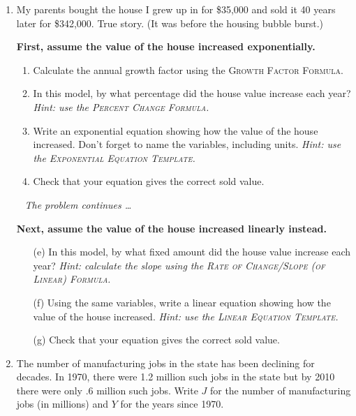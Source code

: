 \begin{enumerate}

\item My parents bought the house I grew up in for \$35,000 and sold it 40 years later for \$342,000. True story.  (It was before the housing bubble burst.)

\textbf{First, assume the value of the house increased exponentially.}
\begin{enumerate}
\item Calculate the annual growth factor using the \textsc{Growth Factor Formula}. \vfill \vfill
\item In this model, by what percentage did the house value increase each year? \emph{Hint:  use the \textsc{Percent Change Formula}.} \vfill
\item Write an exponential equation showing how the value of the house increased.   Don't forget to name the variables, including units.  \emph{Hint:  use the \textsc{Exponential Equation Template}.} \vfill  \vfill \vfill
\item Check that your equation gives the correct sold value. \vfill
\end{enumerate}

\newpage %
~\hspace{-.5in} \emph{The problem continues \ldots}

\textbf{Next, assume the value of the house increased linearly instead.}
\begin{enumerate} 
\item [(e)] In this model, by what fixed amount did the house value increase each year?  \emph{Hint:  calculate the slope using the \textsc{Rate of Change/Slope (of Linear) Formula}.} \vfill \vfill
\item [(f)] Using the same variables, write a linear equation showing how the value of the house increased.  \emph{Hint:  use the \textsc{Linear Equation Template}.}  \vfill \vfill
\item [(g)] Check that your equation gives the correct sold value.  \vfill
\end{enumerate}

\newpage %

\item The number of manufacturing jobs in the state has been declining for decades. In 1970, there were 1.2 million such jobs in the state but by 2010 there were only .6 million such jobs.   Write $J$ for the number of manufacturing jobs (in millions) and $Y$ for the years since 1970.


\end{enumerate}
